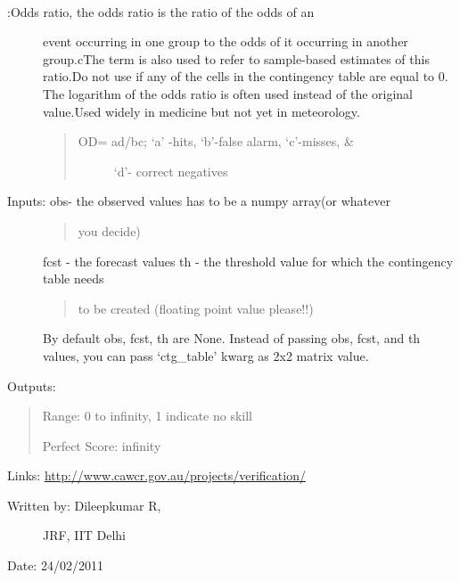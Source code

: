 \documentclass[letterpaper,10pt,english]{sphinxmanual}
\begin{document}

\begin{fulllineitems}
\label{diagnosis:ctgfunction.odr}~\begin{description}
\item[{{\hyperref[diagnosis:ctgfunction.odr]{}}:Odds ratio, the odds ratio is the ratio of the odds of an}] \leavevmode
event occurring in one group to the odds of it occurring in
another group.cThe term is also used to refer to sample-based
estimates of this ratio.Do not use if any of the cells in the
contingency table are equal to 0. The logarithm of the odds
ratio is often used instead of the original value.Used widely
in medicine but not yet in meteorology.
\begin{quote}
\begin{description}
\item[{OD= ad/bc; `a' -hits, `b'-false alarm, `c'-misses, \&}] \leavevmode
`d'- correct negatives

\end{description}
\end{quote}

\item[{Inputs: obs- the observed values has to be a numpy array(or whatever}] \leavevmode\begin{quote}

you decide)
\end{quote}

fcst - the forecast values
th  - the threshold value for which the contingency table needs
\begin{quote}

to be created (floating point value please!!)
\end{quote}

By default obs, fcst, th are None. Instead of passing obs, fcst,
and th values, you can pass `ctg\_table' kwarg as 2x2 matrix value.

\end{description}

Outputs:
\begin{quote}

Range: 0 to infinity, 1 indicate no skill

Perfect Score: infinity
\end{quote}

Links: \href{http://www.cawcr.gov.au/projects/verification/}{http://www.cawcr.gov.au/projects/verification/}
\begin{description}
\item[{Written by: Dileepkumar R,}] \leavevmode
JRF, IIT Delhi

\end{description}

Date: 24/02/2011

\end{fulllineitems}
\end{document}
